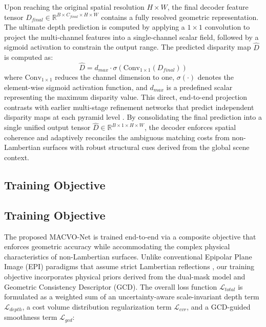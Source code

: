 \documentclass[lettersize,journal]{IEEEtran}
\begin{document}
Upon reaching the original spatial resolution $H \times W$, the final decoder feature tensor $D_{final} \in \mathbb{R}^{B \times C_{final} \times H \times W}$ contains a fully resolved geometric representation. The ultimate depth prediction is computed by applying a $1 \times 1$ convolution to project the multi-channel features into a single-channel scalar field, followed by a sigmoid activation to constrain the output range. The predicted disparity map $\hat{D}$ is computed as:
\begin{equation}
\hat{D} = d_{max} \cdot \sigma \left( \text{Conv}_{1 \times 1}(D_{final}) \right)
\end{equation}
where $\text{Conv}_{1 \times 1}$ reduces the channel dimension to one, $\sigma(\cdot)$ denotes the element-wise sigmoid activation function, and $d_{max}$ is a predefined scalar representing the maximum disparity value. This direct, end-to-end projection contrasts with earlier multi-stage refinement networks that predict independent disparity maps at each pyramid level \cite{eigen2014, lin2017}. By consolidating the final prediction into a single unified output tensor $\hat{D} \in \mathbb{R}^{B \times 1 \times H \times W}$, the decoder enforces spatial coherence and adaptively reconciles the ambiguous matching costs from non-Lambertian surfaces with robust structural cues derived from the global scene context.

\subsection{Training Objective}

\subsection{Training Objective}
The proposed MACVO-Net is trained end-to-end via a composite objective that enforces geometric accuracy while accommodating the complex physical characteristics of non-Lambertian surfaces. Unlike conventional Epipolar Plane Image (EPI) paradigms that assume strict Lambertian reflections \cite{heber2018}, our training objective incorporates physical priors derived from the dual-mask model and Geometric Consistency Descriptor (GCD). The overall loss function $\mathcal{L}_{total}$ is formulated as a weighted sum of an uncertainty-aware scale-invariant depth term $\mathcal{L}_{depth}$, a cost volume distribution regularization term $\mathcal{L}_{cvr}$, and a GCD-guided smoothness term $\mathcal{L}_{gcd}$:
\end{document}
